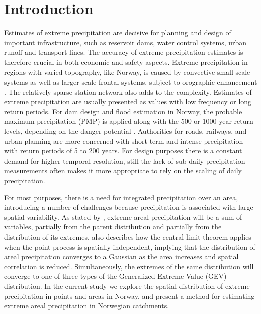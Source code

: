\documentclass[12pt,a4paper,english]{article}
\begin{document}
\vspace{10mm}

\section{Introduction}

Estimates of extreme precipitation are decisive for planning and design of important infrastructure, such as reservoir dams, water control systems, urban runoff and transport lines. The accuracy of extreme precipitation estimates is therefore crucial in both economic and safety aspects. Extreme precipitation in regions with varied topography, like Norway, is caused by convective small-scale systems as well as larger scale frontal systems, subject to orographic enhancement \citep{Roe2005}. The relatively sparse station network also adds to the complexity. Estimates of extreme precipitation are usually presented as values with low frequency or long return periods. For dam design and flood estimation in Norway, the probable maximum precipitation (PMP) is applied along with the 500 or 1000 year return levels, depending on the danger potential \citep{NVE2011b}. Authorities for roads, railways, and urban planning are more concerned with short-term and intense precipitation with return periods of 5 to 200 years. For design purposes there is a constant demand for higher temporal resolution, still the lack of sub-daily precipitation measurements often makes it more appropriate to rely on the scaling of daily precipitation.

For most purposes, there is a need for integrated precipitation over an area, introducing a number of challenges because precipitation is associated with large spatial variability. As stated by \cite{Skaugenetal1996}, extreme areal precipitation will be a sum of variables, partially from the parent distribution and partially from the distribution of its extremes. \cite{Skaugenetal1996} also describes how the central limit theorem applies when the point process is spatially independent, implying that the distribution of areal precipitation converges to a Gaussian as the area increases and spatial correlation is reduced. Simultaneously, the extremes of the same distribution will converge to one of three types of the Generalized Extreme Value (GEV) distribution. In the current study we explore the spatial distribution of extreme precipitation in points and areas in Norway, and present a method for estimating extreme areal precipitation in Norwegian catchments.
\end{document}
